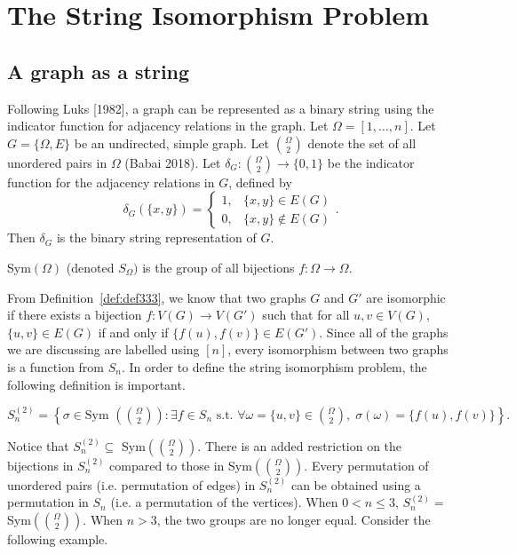\section{The String Isomorphism Problem}
\subsection{A graph as a string}
Following Luks [1982], a graph can be represented as a binary string using the indicator function for adjacency relations in the graph. Let $\Omega=[1,\dots,n]$. Let $G=\{\Omega,E\}$ be an undirected, simple graph. Let ${\Omega\choose 2}$ denote the set of all unordered pairs in $\Omega$ (Babai 2018). Let $\delta_G:{\Omega\choose 2}\rightarrow\{0,1\}$ be the indicator function for the adjacency relations in $G$, defined by
\[\delta_G(\{x,y\})=\begin{cases}
1,&\{x,y\}\in E(G)\\
0,&\{x,y\}\notin E(G)
\end{cases}.
\]
Then $\delta_G$ is the binary string representation of $G$.
\begin{definition}\label{def:def444}
Sym$(\Omega) $ (denoted $S_\Omega)$ is the group of all bijections $f:\Omega\rightarrow\Omega$.
\end{definition}
From Definition~\ref{def:def333}, we know that two graphs $G$ and $G'$ are isomorphic if there exists a bijection $f:V(G)\rightarrow V(G')$ such that for all $u,v\in V(G)$, $\{u,v\}\in E(G)$ if and only if $\{f(u),f(v)\}\in E(G')$. Since all of the graphs we are discussing are labelled using $[n]$, every isomorphism between two graphs is a function from $S_n$. In order to define the string isomorphism problem, the following definition is important.
\begin{definition}$\;$\\
$S_n^{(2)}=\left\{\sigma\in\text{Sym }\left({\Omega\choose2}\right):\exists f\in S_n\text{ s.t. }\forall \omega=\{u,v\}\in{\Omega\choose2},\;\sigma(\omega)=\{f(u),f(v)\} \right\}.$
\end{definition}
Notice that $S_n^{(2)}\subseteq$ Sym$({\Omega\choose 2})$. There is an added restriction on the bijections in $S_n^{(2)}$ compared to those in Sym$({\Omega\choose 2})$. Every permutation of unordered pairs (i.e. permutation of edges) in $S_n^{(2)}$ can be obtained using a permutation in $S_n$ (i.e. a permutation of the vertices). When $0<n\le 3$, $S_n^{(2)}=$Sym$({\Omega\choose 2})$. When $n>3$, the two groups are no longer equal. Consider the following example.
